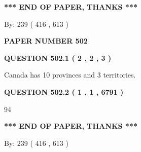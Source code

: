 \documentclass[12pt]{article}
\begin{document}
   
   
\vspace{1.0in} 
{\textbf{\large{ *** END OF PAPER, THANKS *** }}} 
   
   
\hspace{1.0in} By: 
 239 ( 416 ,  613 )
   
   
   
   
\newpage 
\setcounter{page}{ 
   502001 } 
   
   
   
   
 {\textbf{ \Large{ PAPER NUMBER  502  }}}
   
   
\vspace{0.2in}
   
   
   
   
   
   
 \vspace{0.2in}
 
 
 
 
   
   
  
\vspace{0.2in}
  
{\textbf{\Large{QUESTION
502.1 
 ( 2 , 2 , 3 )
}}}
  
  
 
 
\noindent{}
 
 
Canada has 10  provinces and 3 territories.
 
 
 
 
  
\vspace{0.2in}
  
{\textbf{\Large{QUESTION
502.2 
 ( 1 , 1 , 6791 )
}}}
  
  
 
 
\noindent{}

94
 
 
   
   
 \vspace{0.2in}
 
   
   
   
   
\vspace{1.0in} 
{\textbf{\large{ *** END OF PAPER, THANKS *** }}} 
   
   
\hspace{1.0in} By: 
 239 ( 416 ,  613 )
   
\end{document}
